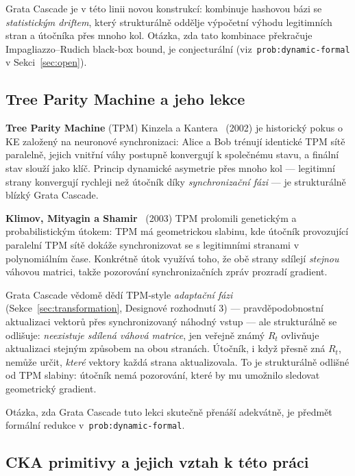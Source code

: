 \documentclass[11pt,a4paper]{article}
\begin{document}
Grata Cascade je v této linii novou konstrukcí: kombinuje hashovou bázi se \emph{statistickým driftem}, který strukturálně oddělje výpočetní výhodu legitimních stran a útočníka přes mnoho kol. Otázka, zda tato kombinace překračuje Impagliazzo--Rudich black-box bound, je conjecturální (viz~\texttt{prob:dynamic-formal} v Sekci~\ref{sec:open}).

\subsection{Tree Parity Machine a jeho lekce}\label{sec:related-tpm}

\textbf{Tree Parity Machine} (TPM) Kinzela a Kantera~\cite{KKK2002} (2002) je historický pokus o KE založený na neuronové synchronizaci: Alice a Bob trénují identické TPM sítě paralelně, jejich vnitřní váhy postupně konvergují k společnému stavu, a finální stav slouží jako klíč. Princip dynamické asymetrie přes mnoho kol --- legitimní strany konvergují rychleji než útočník díky \emph{synchronizační fázi} --- je strukturálně blízký Grata Cascade.

\textbf{Klimov, Mityagin a Shamir}~\cite{KMS2003} (2003) TPM prolomili genetickým a probabilistickým útokem: TPM má geometrickou slabinu, kde útočník provozující paralelní TPM sítě dokáže synchronizovat se s legitimními stranami v polynomiálním čase. Konkrétně útok využívá toho, že obě strany sdílejí \emph{stejnou} váhovou matrici, takže pozorování synchronizačních zpráv prozradí gradient.

Grata Cascade vědomě dědí TPM-style \emph{adaptační fázi} (Sekce~\ref{sec:transformation}, Designové rozhodnutí 3) --- pravděpodobnostní aktualizaci vektorů přes synchronizovaný náhodný vstup --- ale strukturálně se odlišuje: \emph{neexistuje sdílená váhová matrice}, jen veřejně známý $R_t$ ovlivňuje aktualizaci stejným způsobem na obou stranách. Útočník, i když přesně zná $R_t$, nemůže určit, \emph{které} vektory každá strana aktualizovala. To je strukturálně odlišné od TPM slabiny: útočník nemá pozorování, které by mu umožnilo sledovat geometrický gradient.

Otázka, zda Grata Cascade tuto lekci skutečně přenáší adekvátně, je předmět formální redukce v~\texttt{prob:dynamic-formal}.

\subsection{CKA primitivy a jejich vztah k této práci}\label{sec:related-cka}
\end{document}
